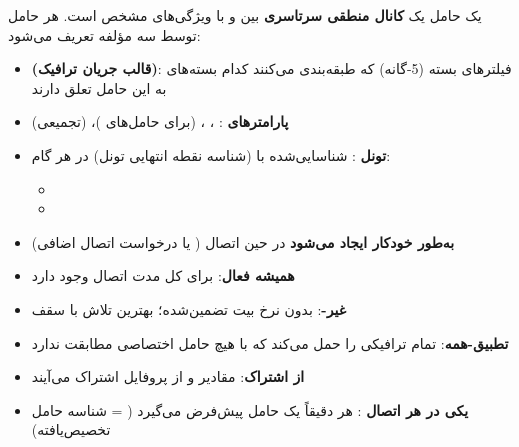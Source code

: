 
\CNchained{}

یک حامل  یک \textbf{کانال منطقی سرتاسری} بین  و  با ویژگی‌های  مشخص است. هر حامل توسط سه مؤلفه تعریف می‌شود:


\begin{itemize}
\tightlist
\item
  \textbf{ (قالب جریان ترافیک)}: فیلترهای بسته (5-گانه) که طبقه‌بندی می‌کنند کدام بسته‌های  به این حامل تعلق دارند
\item
  \textbf{پارامترهای }: ، ،  (برای حامل‌های )،  (تجمیعی)
\item
  \textbf{تونل }: شناسایی‌شده با  (شناسه نقطه انتهایی تونل) در هر گام:

  \begin{itemize}
  \tightlist
  \item
  \item
  \end{itemize}
\end{itemize}





\begin{itemize}
\tightlist
\item
  \textbf{به‌طور خودکار ایجاد می‌شود} در حین اتصال  ( یا درخواست اتصال  اضافی)
\item
  \textbf{همیشه فعال}: برای کل مدت اتصال  وجود دارد
\item
  \textbf{غیر-}: بدون نرخ بیت تضمین‌شده؛ بهترین تلاش با سقف 
\item
  \textbf{ تطبیق-همه}: تمام ترافیکی را حمل می‌کند که با  هیچ حامل اختصاصی مطابقت ندارد
\item
  \textbf{ از اشتراک}: مقادیر  و  از پروفایل اشتراک  می‌آیند
\item
  \textbf{یکی در هر اتصال }: هر  دقیقاً یک حامل پیش‌فرض می‌گیرد ( = شناسه حامل  تخصیص‌یافته)
\end{itemize}

